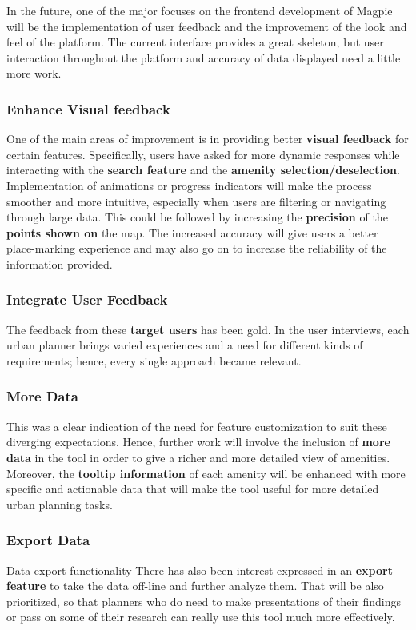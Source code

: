 In the future, one of the major focuses on the frontend development of Magpie will be the implementation of user feedback and the improvement of the look and feel of the platform. The current interface provides a great skeleton, but user interaction throughout the platform and accuracy of data displayed need a little more work.

\subsubsection{Enhance Visual feedback}

One of the main areas of improvement is in providing better \textbf{visual feedback} for certain features. Specifically, users have asked for more dynamic responses while interacting with the \textbf{search feature} and the \textbf{amenity selection/deselection}. Implementation of animations or progress indicators will make the process smoother and more intuitive, especially when users are filtering or navigating through large data. This could be followed by increasing the \textbf{precision} of the \textbf{points shown on} the map. The increased accuracy will give users a better place{-}marking experience and may also go on to increase the reliability of the information provided.

\subsubsection{Integrate User Feedback}

The feedback from these \textbf{target users} has been gold. In the user interviews, each urban planner brings varied experiences and a need for different kinds of requirements; hence, every single approach became relevant.

\subsubsection{More Data}

This was a clear indication of the need for feature customization to suit these diverging expectations. Hence, further work will involve the inclusion of \textbf{more data} in the tool in order to give a richer and more detailed view of amenities. Moreover, the \textbf{tooltip information} of each amenity will be enhanced with more specific and actionable data that will make the tool useful for more detailed urban planning tasks.

\subsubsection{Export Data}

Data export functionality There has also been interest expressed in an \textbf{export feature} to take the data off{-}line and further analyze them. That will be also prioritized, so that planners who do need to make presentations of their findings or pass on some of their research can really use this tool much more effectively.